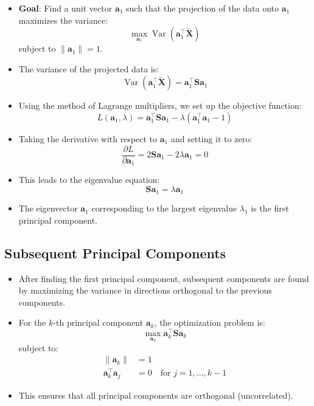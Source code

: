 \documentclass{article}
\begin{document}
\begin{itemize}
    \item \textbf{Goal}: Find a unit vector $\mathbf{a}_1$ such that the projection of the data onto $\mathbf{a}_1$ maximizes the variance:
    \[
    \max_{\mathbf{a}_1} \operatorname{Var}(\mathbf{a}_1^\top \tilde{\mathbf{X}})
    \]
    subject to $\|\mathbf{a}_1\| = 1$.
    \item The variance of the projected data is:
    \[
    \operatorname{Var}(\mathbf{a}_1^\top \tilde{\mathbf{X}}) = \mathbf{a}_1^\top \mathbf{S} \mathbf{a}_1
    \]
    \item Using the method of Lagrange multipliers, we set up the objective function:
    \[
    L(\mathbf{a}_1, \lambda) = \mathbf{a}_1^\top \mathbf{S} \mathbf{a}_1 - \lambda (\mathbf{a}_1^\top \mathbf{a}_1 - 1)
    \]
    \item Taking the derivative with respect to $\mathbf{a}_1$ and setting it to zero:
    \[
    \frac{\partial L}{\partial \mathbf{a}_1} = 2\mathbf{S} \mathbf{a}_1 - 2\lambda \mathbf{a}_1 = 0
    \]
    \item This leads to the eigenvalue equation:
    \[
    \mathbf{S} \mathbf{a}_1 = \lambda \mathbf{a}_1
    \]
    \item The eigenvector $\mathbf{a}_1$ corresponding to the largest eigenvalue $\lambda_1$ is the first principal component.
\end{itemize}

\subsection{Subsequent Principal Components}

\begin{itemize}
    \item After finding the first principal component, subsequent components are found by maximizing the variance in directions orthogonal to the previous components.
    \item For the $k$-th principal component $\mathbf{a}_k$, the optimization problem is:
    \[
    \max_{\mathbf{a}_k} \mathbf{a}_k^\top \mathbf{S} \mathbf{a}_k
    \]
    subject to:
    \begin{align*}
    \|\mathbf{a}_k\| &= 1 \\
    \mathbf{a}_k^\top \mathbf{a}_j &= 0 \quad \text{for } j = 1, \dots, k-1
    \end{align*}
    \item This ensures that all principal components are orthogonal (uncorrelated).
\end{itemize}
\end{document}
